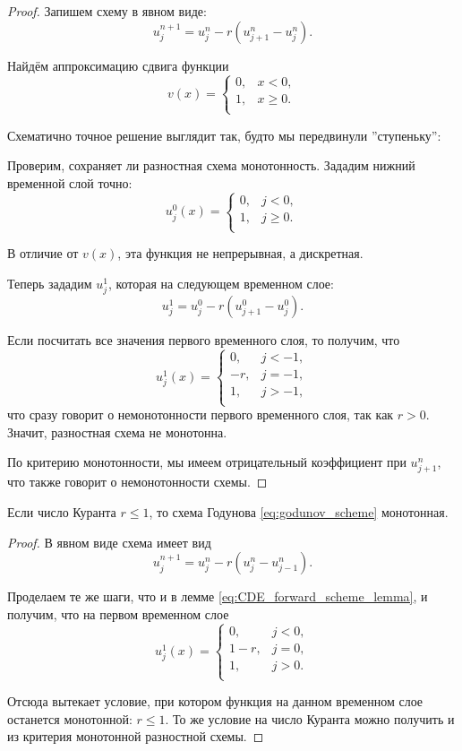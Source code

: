 \documentclass{article}
\begin{document}
\begin{proof}\label{eq:CDE_forward_scheme_lemma}
	Запишем схему в явном виде:
	\[u_j^{n+1}=u_j^n-r(u_{j+1}^n-u_j^n).\]

	Найдём аппроксимацию сдвига функции
	\[v(x)=
		\begin{cases}
			0, & x<0, \\
			1, & x\ge 0. \\
		\end{cases}
	\]

	Схематично точное решение выглядит так, будто мы передвинули
	''ступеньку'':

	

	Проверим, сохраняет ли разностная схема монотонность. Зададим нижний
	временной слой точно:
	\[u_j^0(x)=
		\begin{cases}
			0, & j<0, \\
			1, & j\ge 0. \\
		\end{cases}
	\]

	В отличие от $v(x)$, эта функция не непрерывная, а дискретная.

	Теперь зададим $u_j^1$, которая на следующем временном слое:
	\[u_j^1=u_j^0-r(u_{j+1}^0-u_j^0).\]

	Если посчитать все значения первого временного слоя, то получим, что
	\[u_j^1(x)=
		\begin{cases}
			0, & j<-1, \\
			-r,& j=-1, \\
			1, & j>-1, \\
		\end{cases}
	\]
	что сразу говорит о немонотонности первого временного слоя, так как
	$r>0$. Значит, разностная схема не монотонна.

	По критерию монотонности, мы имеем отрицательный коэффициент при
	$u_{j+1}^n$, что также говорит о немонотонности схемы.
\end{proof}

\begin{theorem}\label{eq:courant_condition}
	Если число Куранта $r\le 1$, то схема Годунова
	\eqref{eq:godunov_scheme} монотонная.
\end{theorem}

\begin{proof}
	В явном виде схема имеет вид
	\[u_j^{n+1}=u_j^n-r(u_j^n-u_{j-1}^n).\]

	Проделаем те же шаги, что и в лемме \eqref{eq:CDE_forward_scheme_lemma},
	и получим, что на первом временном слое
	\[u_j^1(x)=
		\begin{cases}
			0,   & j<0, \\
			1-r, & j=0, \\
			1,   & j>0. \\
		\end{cases}
	\]

	Отсюда вытекает условие, при котором функция на данном временном слое
	останется монотонной: $r\le 1$. То же условие на число Куранта можно
	получить и из критерия монотонной разностной схемы.
\end{proof}
\end{document}
